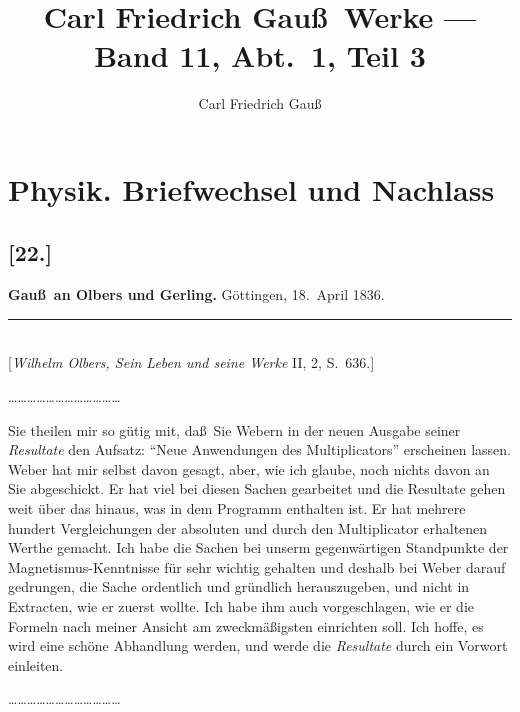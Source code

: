 \documentclass[12pt,a4paper]{article}
\title{Carl Friedrich Gau\ss\ Werke --- Band 11, Abt.~1, Teil 3}
\author{Carl Friedrich Gau\ss}
\date{}
\theoremstyle{plain}
\theoremstyle{definition}
\theoremstyle{remark}
\begin{document}
\maketitle

\section*{Physik. Briefwechsel und Nachlass}


\subsection*{[22.]}
\begin{center}
\textbf{Gau\ss\ an Olbers und Gerling.} G\"ottingen, 18.~April 1836.
\end{center}
\begin{center}
\rule{6cm}{0.4pt}\\[4pt]
[{\it Wilhelm Olbers, Sein Leben und seine Werke} II, 2, S.~636.]
\end{center}

\smallskip
\ldots\ldots\ldots\ldots\ldots\ldots\ldots\ldots\ldots\ldots\ldots\ldots
\smallskip

Sie theilen mir so g\"utig mit, da\ss\ Sie {\sc Weber}n in der neuen
Ausgabe seiner {\it Resultate} den Aufsatz: ``Neue Anwendungen des
Multiplicators'' erscheinen lassen. {\sc Weber} hat mir selbst davon
gesagt, aber, wie ich glaube, noch nichts davon an Sie abgeschickt. Er
hat viel bei diesen Sachen gearbeitet und die Resultate gehen weit
\"uber das hinaus, was in dem Programm enthalten ist. Er hat mehrere
hundert Vergleichungen der absoluten und durch den Multiplicator
erhaltenen Werthe gemacht. Ich habe die Sachen bei unserm
gegenw\"artigen Standpunkte der Magnetismus-Kenntnisse f\"ur sehr
wichtig gehalten und deshalb bei {\sc Weber} darauf gedrungen, die
Sache ordentlich und gr\"undlich herauszugeben, und nicht in
Extracten, wie er zuerst wollte. Ich habe ihm auch vorgeschlagen,
wie er die Formeln nach meiner Ansicht am zweckm\"a\ss igsten
einrichten soll. Ich hoffe, es wird eine sch\"one Abhandlung werden,
und werde die {\it Resultate} durch ein Vorwort einleiten.

\smallskip
\ldots\ldots\ldots\ldots\ldots\ldots\ldots\ldots\ldots\ldots\ldots\ldots
\smallskip
\end{document}
